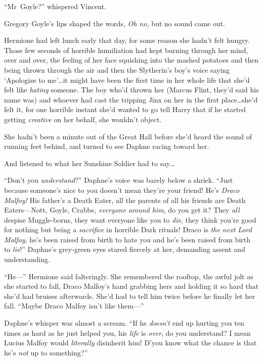 “Mr~Goyle?” whispered Vincent.

Gregory Goyle’s lips shaped the words, \emph{Oh no,} but no sound came out.

\later

Hermione had left lunch early that day, for some reason she hadn’t felt hungry. Those few seconds of horrible humiliation had kept burning through her mind, over and over, the feeling of her face squishing into the mashed potatoes and then being thrown through the air and then the Slytherin’s boy’s voice saying ‘Apologize to me’…it might have been the first time in her whole life that she’d felt like \emph{hating} someone. The boy who’d thrown her (Marcus Flint, they’d said his name was) and whoever had cast the tripping Jinx on her in the first place…she’d felt it, for one horrible instant she’d wanted to go tell Harry that if he started getting \emph{creative} on her behalf, she wouldn’t object.

She hadn’t been a minute out of the Great Hall before she’d heard the sound of running feet behind, and turned to see Daphne racing toward her.

And listened to what her Sunshine Soldier had to say…

“Don’t you \emph{understand}?” Daphne’s voice was barely below a shriek. “Just because someone’s nice to you doesn’t mean they’re your friend! He’s \emph{Draco Malfoy!} His father’s a Death Eater, all the parents of all his friends are Death Eaters—Nott, Goyle, Crabbe, \emph{everyone around him}, do you get it? They \emph{all} despise Muggle-borns, they want everyone like you to \emph{die}, they think you’re good for nothing but being a \emph{sacrifice} in horrible Dark rituals! Draco is \emph{the next Lord Malfoy}, he’s been raised from birth to hate you and he’s been raised from birth to \emph{lie}!” Daphne’s grey-green eyes stared fiercely at her, demanding assent and understanding.

“He—” Hermione said falteringly. She remembered the rooftop, the awful jolt as she started to fall, Draco Malfoy’s hand grabbing hers and holding it so hard that she’d had bruises afterwards. She’d had to tell him twice before he finally let her fall. “Maybe Draco Malfoy isn’t like them—”

Daphne’s whisper was almost a scream. “If he \emph{doesn’t} end up hurting you ten times as hard as he just helped you, his \emph{life} is \emph{over}, do you understand? I mean Lucius Malfoy would \emph{literally} disinherit him! D’you know what the chance is that he’s \emph{not} up to something?”

